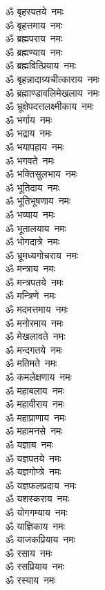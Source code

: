 \begin{multicols}{2}
\begin{flushleft}
ॐ बृहस्पतये~नमः\\
ॐ बृहत्तमाय~नमः\\
ॐ ब्रह्मपराय~नमः\\
ॐ ब्रह्मण्याय~नमः\\
ॐ ब्रह्मवित्प्रियाय~नमः\hfill{}\\
ॐ बृहन्नादाग्र्यचीत्काराय~नमः\\
ॐ ब्रह्माण्डावलिमेखलाय~नमः\\
ॐ भ्रूक्षेपदत्तलक्ष्मीकाय~नमः\\
ॐ भर्गाय~नमः\\
ॐ भद्राय~नमः\\
ॐ भयापहाय~नमः\\
ॐ भगवते~नमः\\
ॐ भक्तिसुलभाय~नमः\\
ॐ भूतिदाय~नमः\\
ॐ भूतिभूषणाय~नमः\hfill{}\\
ॐ भव्याय~नमः\\
ॐ भूतालयाय~नमः\\
ॐ भोगदात्रे~नमः\\
ॐ भ्रूमध्यगोचराय~नमः\\
ॐ मन्त्राय~नमः\\
ॐ मन्त्रपतये~नमः\\
ॐ मन्त्रिणे~नमः\\
ॐ मदमत्तमाय~नमः\\
ॐ मनोरमाय~नमः\\
ॐ मेखलावते~नमः\hfill{}\\
ॐ मन्दगतये~नमः\\
ॐ मतिमते~नमः\\
ॐ कमलेक्षणाय~नमः\\
ॐ महाबलाय~नमः\\
ॐ महावीराय~नमः\\
ॐ महाप्राणाय~नमः\\
ॐ महामनसे~नमः\\
ॐ यज्ञाय~नमः\\
ॐ यज्ञपतये~नमः\\
ॐ यज्ञगोप्त्रे~नमः\hfill{}\\
ॐ यज्ञफलप्रदाय~नमः\\
ॐ यशस्कराय~नमः\\
ॐ योगगम्याय~नमः\\
ॐ याज्ञिकाय~नमः\\
ॐ याजकप्रियाय~नमः\\
ॐ रसाय~नमः\\
ॐ रसप्रियाय~नमः\\
ॐ रस्याय~नमः\\

\end{flushleft}
\end{multicols}
